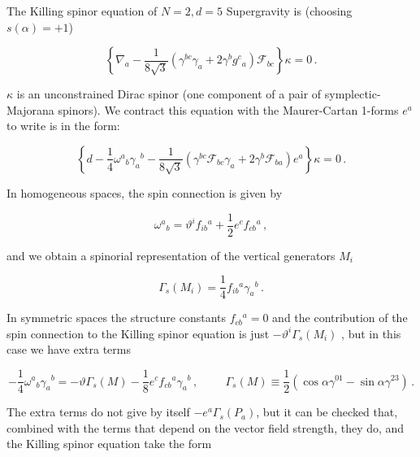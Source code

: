 \documentclass[12pt,a4paper]{article}
\begin{document}
The Killing spinor equation of $N=2,d=5$ Supergravity is (choosing
$s(\alpha)=+1$) \cite{Cremmer:1980gs,Lozano-Tellechea:2002pn}


\begin{equation}
\left\{ \nabla_{a}
-{\textstyle\frac{1}{8\sqrt{3}}}
(\gamma^{bc}\gamma_{a}+2\gamma^{b}g^{c}{}_{a})
\mathcal{F}_{bc}\right\}\kappa=0\, .
\end{equation}

\noindent
$\kappa$ is an unconstrained Dirac spinor (one component of a pair of
symplectic-Majorana spinors).  We contract this equation with the
Maurer-Cartan 1-forms $e^{a}$ to write is in the form:

\begin{equation}
\left\{d -{\textstyle\frac{1}{4}}\omega^{a}{}_{b}\gamma_{a}{}^{b}  
-{\textstyle\frac{1}{8\sqrt{3}}}
(\gamma^{bc}\mathcal{F}_{bc}
\gamma_{a}+2\gamma^{b}\mathcal{F}_{ba})e^{a}
\right\}\kappa=0\, .
\end{equation}

In homogeneous spaces, the spin connection is given by

\begin{equation}
\omega^{a}{}_{b} = \vartheta^{i}f_{ib}{}^{a} 
+{\textstyle\frac{1}{2}} e^{c}f_{cb}{}^{a}\, , 
\end{equation}

\noindent
and we obtain a spinorial representation of the vertical generators $M_{i}$

\begin{equation}
\Gamma_{s}(M_{i})= {\textstyle\frac{1}{4}}f_{ib}{}^{a} 
\gamma_{a}{}^{b}\, .   
\end{equation}

In symmetric spaces the structure constants $f_{cb}{}^{a}=0$ and the
contribution of the spin connection to the Killing spinor equation is just
$-\vartheta^{i}\Gamma_{s}(M_{i})$ \cite{Alonso-Alberca:2002gh}, but in this
case we have extra terms

\begin{equation}
-{\textstyle\frac{1}{4}}\omega^{a}{}_{b} \gamma_{a}{}^{b}= 
-\vartheta\Gamma_{s}(M)
-{\textstyle\frac{1}{8}} e^{c}f_{cb}{}^{a} \gamma_{a}{}^{b}\, ,
\hspace{1cm}
\Gamma_{s}(M) \equiv {\textstyle\frac{1}{2}}
(\cos{\alpha} \gamma^{01} -\sin{\alpha}\gamma^{23})\, .
\end{equation}

\noindent
The extra terms do not give by itself $-e^{a}\Gamma_{s}(P_{a})$, but
it can be checked that, combined with the terms that depend on the
vector field strength, they do, and the Killing spinor equation take
the form
\end{document}
